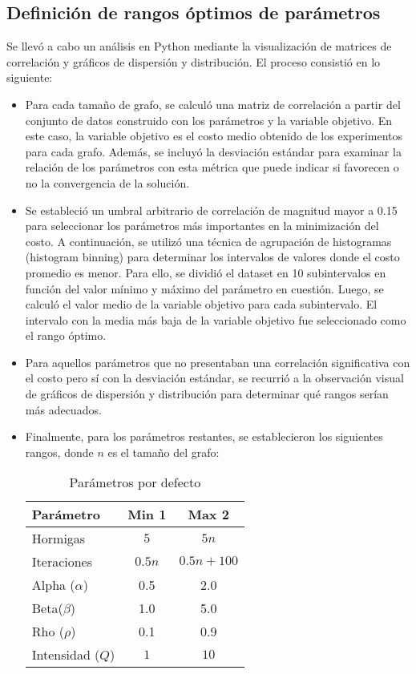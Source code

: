 \documentclass[conference]{IEEEtran}
\begin{document}
\subsection{Definición de rangos óptimos de parámetros}
Se llevó a cabo un análisis en Python mediante la visualización de matrices de correlación y gráficos de dispersión y distribución. El proceso consistió en lo siguiente:
\begin{itemize}
\item Para cada tamaño de grafo, se calculó una matriz de correlación a partir del conjunto de datos construido con los parámetros y la variable objetivo. En este caso, la variable objetivo es el costo medio obtenido de los experimentos para cada grafo. Además, se incluyó la desviación estándar para examinar la relación de los parámetros con esta métrica que puede indicar si favorecen o no la convergencia de la solución.
\item Se estableció un umbral arbitrario de correlación de magnitud mayor a 0.15 para seleccionar los parámetros más importantes en la minimización del costo. A continuación, se utilizó una técnica de agrupación de histogramas (histogram binning) para determinar los intervalos de valores donde el costo promedio es menor. Para ello, se dividió el dataset en 10 subintervalos en función del valor mínimo y máximo del parámetro en cuestión. Luego, se calculó el valor medio de la variable objetivo para cada subintervalo. El intervalo con la media más baja de la variable objetivo fue seleccionado como el rango óptimo.
\item Para aquellos parámetros que no presentaban una correlación significativa con el costo pero sí con la desviación estándar, se recurrió a la observación visual de gráficos de dispersión y distribución para determinar qué rangos serían más adecuados.
\item Finalmente, para los parámetros restantes, se establecieron los siguientes rangos, donde $n$ es el tamaño del grafo:

\begin{table}[h]
  \centering
  \begin{tabular}{|l|c|c|}
    \hline
    Parámetro & Min 1 & Max 2 \\
    \hline
    Hormigas & $5$ & $5n$ \\
    \hline
    Iteraciones & $0.5n$ & $0.5n + 100$ \\
    \hline
    Alpha ($\alpha$) & 0.5 & 2.0 \\
    \hline
    Beta($\beta$) & 1.0 & 5.0 \\
    \hline
    Rho ($\rho$) & 0.1 & 0.9 \\
    \hline
    Intensidad ($Q$) & $1$ & $10$ \\
    \hline
  \end{tabular}
  \caption{Parámetros por defecto}
  \label{tab:table1}
\end{table}
\end{itemize}
\end{document}
